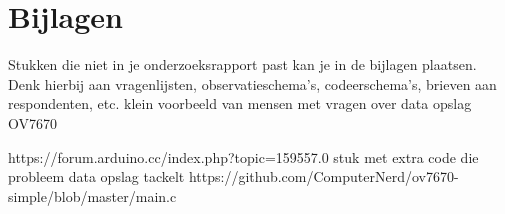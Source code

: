 \documentclass{article}
\begin{document}
\section{Bijlagen}
Stukken die niet in je onderzoeksrapport past kan je in de bijlagen plaatsen. Denk hierbij aan vragenlijsten, observatieschema’s, codeerschema’s, brieven aan respondenten, etc.
klein voorbeeld van mensen met vragen over data opslag OV7670

https://forum.arduino.cc/index.php?topic=159557.0
stuk met extra code die probleem data opslag tackelt
https://github.com/ComputerNerd/ov7670-simple/blob/master/main.c
\end{document}
